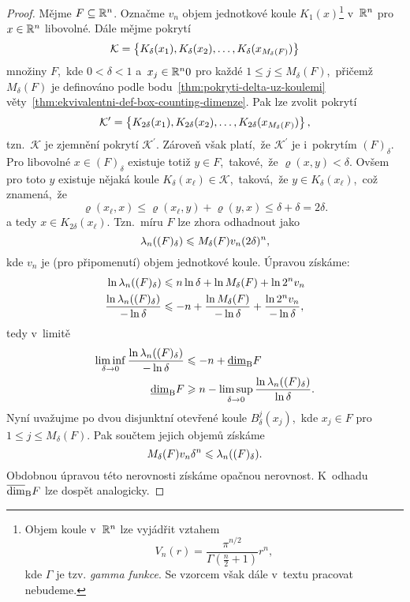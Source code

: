 \begin{proof}
    Mějme $F\subseteq\mathbb{R}^n$. Označme $v_n$ objem jednotkové koule $K_1(x)$\footnote{Objem koule v~$\mathbb{R}^n$ lze vyjádřit vztahem
    \[V_n(r)=\dfrac{\pi^{n/2}}{\Gamma\left(\frac{n}{2}+1\right)}r^n,\]
    kde $\Gamma$ je tzv. \emph{gamma funkce}. Se vzorcem však dále v~textu pracovat nebudeme.
    } v~$\mathbb{R}^n$ pro $x\in\mathbb{R}^n$ libovolné. Dále mějme pokrytí
    \[\mathcal{K}=\left\{K_\delta(x_1),K_\delta(x_2),\ldots,K_\delta(x_{M_\delta(F)})\right\}\]
    množiny $F$,~kde $0<\delta<1$ a~$x_j\in\mathbb{R}^n0$ pro každé $1\leqslant j\leqslant M_\delta(F)$,~přičemž $M_\delta(F)$ je definováno podle bodu~\ref{thm:pokryti-delta-uz-koulemi} věty~\ref{thm:ekvivalentni-def-box-counting-dimenze}. Pak lze zvolit pokrytí
    \[\mathcal{K}^\prime=\left\{K_{2\delta}(x_1),K_{2\delta}(x_2),\ldots,K_{2\delta}(x_{M_\delta(F)})\right\},\]
    tzn.~$\mathcal{K}$ je zjemnění pokrytí $\mathcal{K}^\prime$. Zároveň však platí,~že $\mathcal{K}^\prime$ je i~pokrytím $(F)_\delta$. Pro libovolné $x\in (F)_\delta$ existuje totiž $y\in F$,~takové,~že $\varrho(x,y)<\delta$. Ovšem pro toto $y$ existuje nějaká koule $K_\delta(x_\ell)\in\mathcal{K}$,~taková,~že $y\in K_\delta(x_\ell)$,~což znamená,~že
    \[\varrho(x_\ell,x)\leqslant\varrho(x_\ell,y)+\varrho(y,x)\leqslant\delta+\delta=2\delta.\]
    a tedy $x\in K_{2\delta}(x_\ell)$. Tzn.~míru $F$ lze zhora odhadnout jako
    \[\lambda_n((F)_\delta)\leqslant M_\delta(F)v_n(2\delta)^n,\]
    kde $v_n$ je (pro připomenutí) objem jednotkové koule. Úpravou získáme:
    \begin{align*}
        \ln{\ensuremath{\lambda_n}((F)_\delta)}&\leqslant n\ln{\delta}+\ln{M_\delta(F)}+\ln{2^nv_n}\\
        \dfrac{\ln{\ensuremath{\lambda_n}((F)_\delta)}}{-\ln\delta}&\leqslant -n+\dfrac{\ln{M_\delta(F)}}{-\ln\delta}+\dfrac{\ln{2^nv_n}}{-\ln\delta},
    \end{align*}
    tedy v~limitě
    \begin{align*}
        \liminf_{\delta\to 0}\dfrac{\ln\lambda_n((F)_\delta)}{-\ln\delta}&\leqslant -n+\underline{\dim}_\textup{B}{F}\\
        \underline{\dim}_\textup{B}{F}&\geqslant n-\limsup_{\delta\to 0}\dfrac{\ln\lambda_n((F)_\delta)}{\ln\delta}.
    \end{align*}
    Nyní uvažujme po dvou disjunktní otevřené koule $B_\delta^j(x_j)$,~kde $x_j\in F$ pro $1\leqslant j\leqslant M_\delta(F)$. Pak součtem jejich objemů získáme
    \[M_\delta(F)v_n\delta^n\leqslant\lambda_n((F)_\delta).\]
    Obdobnou úpravou této nerovnosti získáme opačnou nerovnost. K~odhadu $\overline{\dim}_\textup{B}{F}$ lze dospět analogicky.
\end{proof}
